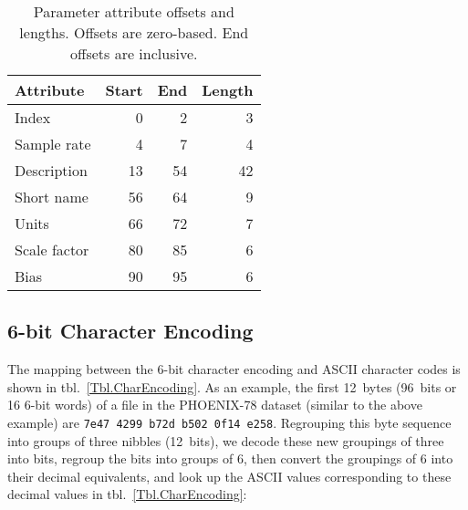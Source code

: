 \documentclass{report}
\begin{document}
\begin{table}[H]
\centering
\caption{Parameter attribute offsets and lengths. Offsets are zero-based. End offsets are inclusive.}
\label{Tbl.ParamOffsets}
\begin{tabular}{lrrr}
Attribute    & Start & End & Length \\
\hline
Index        &  0 &  2 &  3 \\
Sample rate  &  4 &  7 &  4 \\
Description  & 13 & 54 & 42 \\
Short name   & 56 & 64 &  9 \\
Units        & 66 & 72 &  7 \\
Scale factor & 80 & 85 &  6 \\
Bias         & 90 & 95 &  6
\end{tabular}
\end{table}

%



\subsection{6-bit Character Encoding}

The mapping between the 6-bit character encoding and ASCII character codes is shown in tbl.~\ref{Tbl.CharEncoding}. As an example, the first 12~bytes (96~bits or 16 6-bit words) of a file in the PHOENIX-78 dataset (similar to the above example) are \texttt{7e47 4299 b72d b502 0f14 e258}. Regrouping this byte sequence into groups of three nibbles (12~bits), we decode these new groupings of three into bits, regroup the bits into groups of 6, then convert the groupings of 6 into their decimal equivalents, and look up the ASCII values corresponding to these decimal values in tbl.~\ref{Tbl.CharEncoding}:
\end{document}
